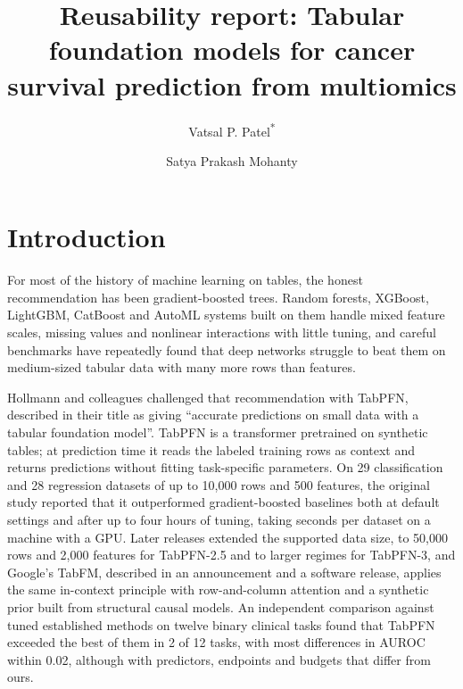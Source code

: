 \documentclass[11pt, a4paper, onecolumn, confidential, copyright]{hawkfranklin}
\title{Reusability report: Tabular foundation models for cancer survival prediction from multiomics}
\author[1]{Vatsal P. Patel\textsuperscript{*}}
\author[1]{Satya Prakash Mohanty}
\affil[1]{HawkFranklin Research, India}
\affil[ ]{\textsuperscript{*}Corresponding author: \href{mailto:vatsal1@hawkfranklin.in}{vatsal1@hawkfranklin.in}}
\begin{document}
\maketitle

\section*{Introduction}

For most of the history of machine learning on tables, the honest recommendation has been gradient-boosted trees. Random forests, XGBoost, LightGBM, CatBoost and AutoML systems built on them handle mixed feature scales, missing values and nonlinear interactions with little tuning, and careful benchmarks have repeatedly found that deep networks struggle to beat them on medium-sized tabular data with many more rows than features.\citep{breiman2001random,chen2016xgboost,ke2017lightgbm,prokhorenkova2018catboost,erickson2020autogluon,grinsztajn2022tree}

Hollmann and colleagues challenged that recommendation with TabPFN, described in their title as giving ``accurate predictions on small data with a tabular foundation model''.\citep{hollmann2025accurate} TabPFN is a transformer pretrained on synthetic tables; at prediction time it reads the labeled training rows as context and returns predictions without fitting task-specific parameters. On 29 classification and 28 regression datasets of up to 10,000 rows and 500 features, the original study reported that it outperformed gradient-boosted baselines both at default settings and after up to four hours of tuning, taking seconds per dataset on a machine with a GPU. Later releases extended the supported data size, to 50,000 rows and 2,000 features for TabPFN-2.5 and to larger regimes for TabPFN-3,\citep{priorlabs2025tabpfn25,priorlabs2026tabpfn3} and Google's TabFM, described in an announcement and a software release, applies the same in-context principle with row-and-column attention and a synthetic prior built from structural causal models.\citep{google2026tabfm,tabfmsoftware2026} An independent comparison against tuned established methods on twelve binary clinical tasks found that TabPFN exceeded the best of them in 2 of 12 tasks, with most differences in AUROC within 0.02, although with predictors, endpoints and budgets that differ from ours.\citep{shaktah2026established}
\end{document}
